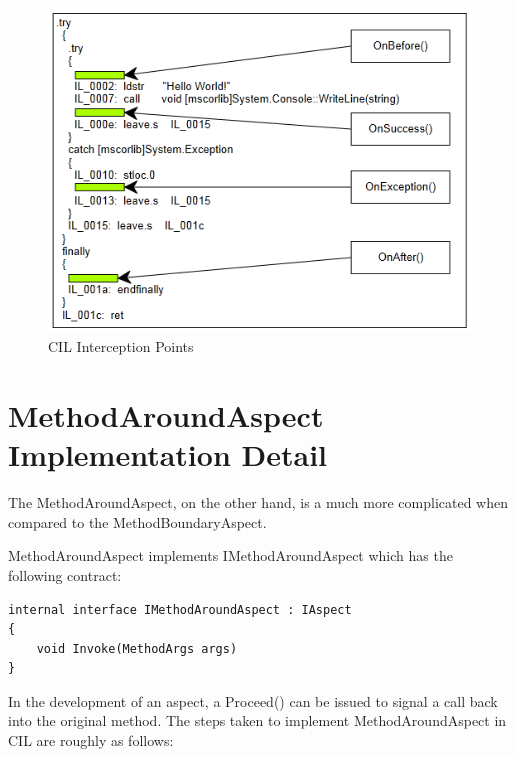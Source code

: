 \begin{figure}[H]
  \includegraphics[scale=1.0]{MethodBoundaryOverview.PNG}
  \centering
  \caption{CIL Interception Points\label{methodboundary02}}
\end{figure}

\section{MethodAroundAspect Implementation Detail}

The MethodAroundAspect, on the other hand, is a much more complicated when compared to the MethodBoundaryAspect.

MethodAroundAspect implements IMethodAroundAspect which has the following contract:

\begin{lstlisting}[caption={IMethodAroundAspect Interface}, label=aroundcontract]
internal interface IMethodAroundAspect : IAspect
{
	void Invoke(MethodArgs args)
}
\end{lstlisting}

In the development of an aspect, a Proceed() can be issued to signal a call back into the original method. The steps taken to implement MethodAroundAspect in CIL are roughly as follows:

